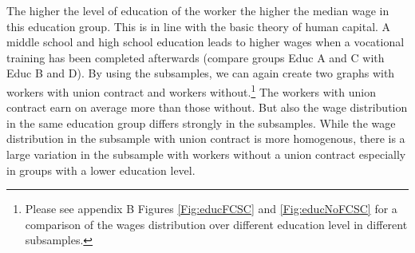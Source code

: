 The higher the level of education of the worker the higher the median wage in this education group. This is in line with the basic theory of human capital. A middle school and high school education leads to higher wages when a vocational training has been completed afterwards (compare groups Educ A and C with Educ B and D). By using the subsamples, we can again create two graphs with workers with union contract and workers without.\footnote{Please see appendix B Figures \ref{Fig:educFCSC} and \ref{Fig:educNoFCSC} for a comparison of the wages distribution over different education level in different subsamples.} The workers with union contract earn on average more than those without. But also the wage distribution in the same education group differs strongly in the subsamples. While the wage distribution in the subsample with union contract is more homogenous, there is a large variation in the subsample with workers without a union contract especially in groups with a lower education level.

